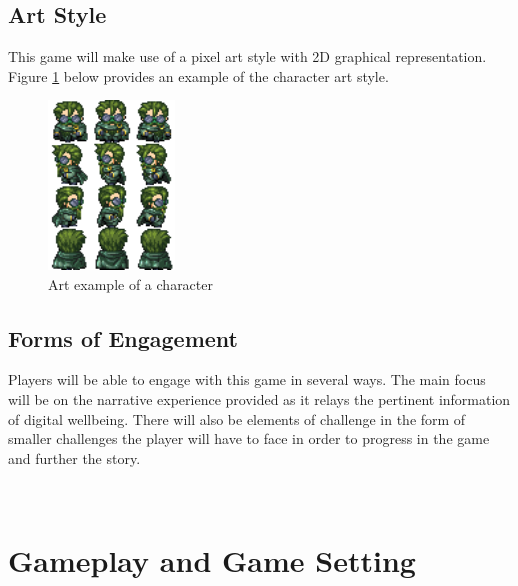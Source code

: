 \documentclass[a4paper]{scrreprt}
\begin{document}
\section{Art Style}
This game will make use of a pixel art style with 2D graphical representation. Figure \ref{fig:art} below provides an example of the character art style.

\begin{figure}[H]
\centering
\includegraphics[width=0.3\textwidth]{example.png}
\caption{\label{fig:art} Art example of a character}
\end{figure}

\section{Forms of Engagement}
Players will be able to engage with this game in several ways. The main focus will be on the narrative experience provided as it relays the pertinent information of digital wellbeing. There will also be elements of challenge in the form of smaller challenges the player will have to face in order to progress in the game and further the story.

\


\chapter{Gameplay and Game Setting}
\end{document}
